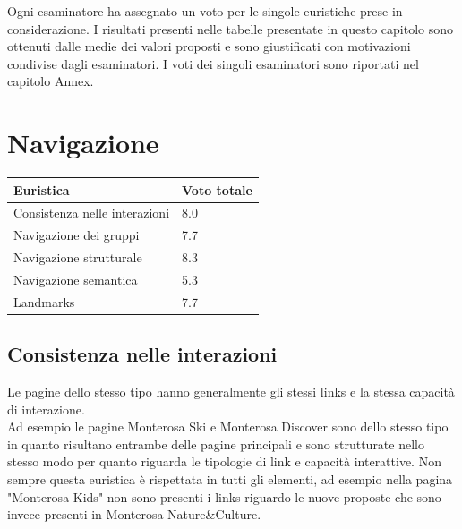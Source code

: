     Ogni esaminatore ha assegnato un voto per le singole euristiche prese in
    considerazione. I risultati presenti nelle tabelle presentate in questo
    capitolo sono ottenuti dalle medie dei valori proposti e sono giustificati
    con motivazioni condivise dagli esaminatori. I voti dei singoli esaminatori
    sono riportati nel capitolo Annex.
    \section{Navigazione}
    \begin{table}[H]
        \begin{tabular}{|l|l|}
            \hline \textbf{Euristica} & \textbf{Voto totale} \\ \hline
            Consistenza nelle interazioni           & 8.0 \\ \hline
            Navigazione dei gruppi                  & 7.7 \\ \hline
            Navigazione strutturale                 & 8.3 \\ \hline
            Navigazione semantica                   & 5.3 \\ \hline
            Landmarks                               & 7.7 \\ \hline

            \end{tabular}
        \end{table}

        \subsection{Consistenza nelle interazioni}
        Le pagine dello stesso tipo hanno generalmente gli stessi links e la
        stessa capacità di interazione. \\
        Ad esempio le pagine Monterosa Ski e Monterosa Discover sono dello
        stesso tipo in quanto risultano entrambe delle pagine principali e sono
        strutturate nello stesso modo per quanto riguarda le tipologie di link e
        capacità interattive. Non sempre questa euristica è rispettata in tutti gli
        elementi, ad esempio nella pagina "Monterosa Kids" non sono presenti i
        links riguardo le nuove proposte che sono invece presenti in Monterosa
        Nature\&Culture.
    
